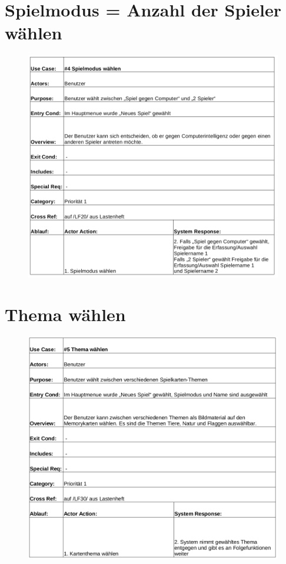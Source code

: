 \clearpage
\section{Spielmodus = Anzahl der Spieler wählen}
\begin{figure}[!h]
	\centering
    \includegraphics[width=\textwidth]{./ucbSpielmodus.png}
	\label{}
\end{figure}

\clearpage
\section{Thema wählen}
\begin{figure}[!h]
	\centering
    \includegraphics[width=\textwidth]{./ucbThema.png}
	\label{}
\end{figure} 

